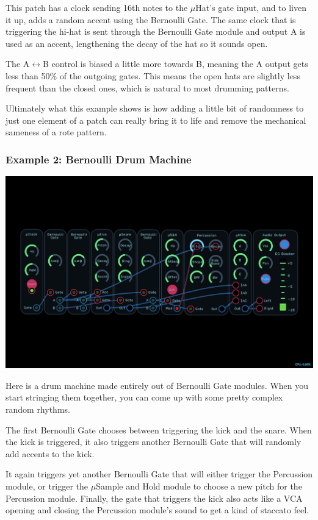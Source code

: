 \documentclass[11pt]{book}
\begin{document}
\begin{multicols*}{2}
This patch has a clock sending 16th notes to the $\mu$Hat's gate input, and to liven it up, adds a random accent using the Bernoulli Gate. The same clock that is triggering the hi-hat is sent through the Bernoulli Gate module and output A is used as an accent, lengthening the decay of the hat so it sounds open.

The A$\leftrightarrow$B control is biased a little more towards B, meaning the A output gets less than 50\% of the outgoing gates. This means the open hats are slightly less frequent than the closed ones, which is natural to most drumming patterns.

Ultimately what this example shows is how adding a little bit of randomness to just one element of a patch can really bring it to life and remove the mechanical sameness of a rote pattern. 

\subsubsection*{Example 2: Bernoulli Drum Machine}

\begin{center}
\includegraphics[width=0.95\linewidth]{bernoulli-gate-fig5.png}
\end{center}

Here is a drum machine made entirely out of Bernoulli Gate modules. When you start stringing them together, you can come up with some pretty complex random rhythms.

The first Bernoulli Gate chooses between triggering the kick and the snare. When the kick is triggered, it also triggers another Bernoulli Gate that will randomly add accents to the kick. 

It again triggers yet another Bernoulli Gate that will either trigger the Percussion module, or trigger the $\mu$Sample and Hold module to choose a new pitch for the Percussion module. Finally, the gate that triggers the kick also acts like a VCA opening and closing the Percussion module's sound to get a kind of staccato feel.


\end{multicols*}
\end{document}

